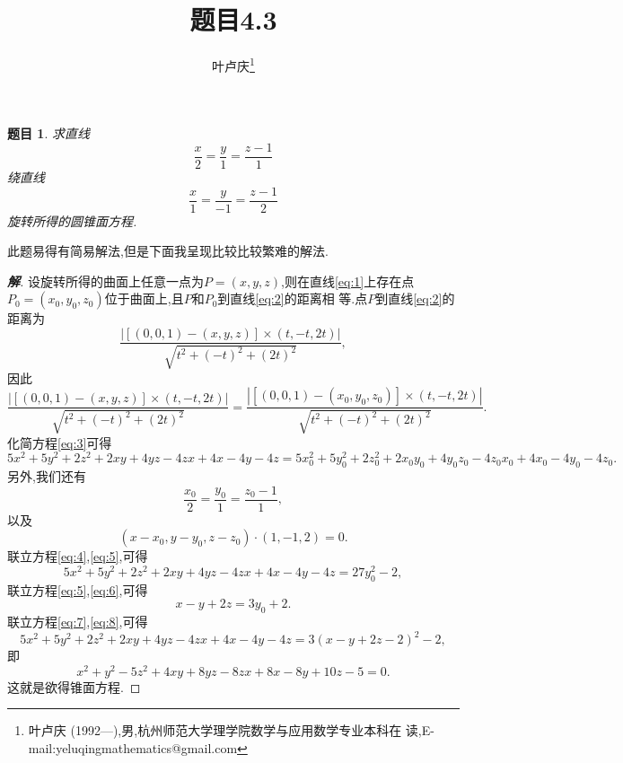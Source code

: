 \documentclass[a4paper]{article}
\newtheorem*{exe}{题目}
\newenvironment{exercise}
{\bigskip\begin{mdframed}\begin{exe}}
    {\end{exe}\end{mdframed}\bigskip}
\begin{document}
\title{\huge{\bf{题目4.3}}} \author{\small{叶卢庆\footnote{叶卢庆
      (1992---),男,杭州师范大学理学院数学与应用数学专业本科在
      读,E-mail:yeluqingmathematics@gmail.com}}}
\maketitle
\begin{exercise}
求直线
\begin{equation}\label{eq:1}
\frac{x}{2}=\frac{y}{1}=\frac{z-1}{1}
\end{equation}
绕直线
\begin{equation}\label{eq:2}
\frac{x}{1}=\frac{y}{-1}=\frac{z-1}{2}
\end{equation}
旋转所得的圆锥面方程.
\end{exercise}
此题易得有简易解法,但是下面我呈现比较比较繁难的解法.
\begin{proof}[\textbf{解}]
设旋转所得的曲面上任意一点为$P=(x,y,z)$,则在直线\eqref{eq:1}上存在点
$P_{0}=(x_0,y_0,z_0)$位于曲面上,且$P$和$P_0$到直线\eqref{eq:2}的距离相
等.点$P$到直线\eqref{eq:2}的距离为
$$
\frac{\left|\left[(0,0,1)-(x,y,z)\right]\times (t,-t,2t)\right|}{\sqrt{t^2+(-t)^2+(2t)^2}},
$$
因此
\begin{equation}
  \label{eq:3}
  \frac{\left|\left[(0,0,1)-(x,y,z)\right]\times (t,-t,2t)\right|}{\sqrt{t^2+(-t)^2+(2t)^2}}=\frac{\left|\left[(0,0,1)-(x_0,y_0,z_0)\right]\times (t,-t,2t)\right|}{\sqrt{t^2+(-t)^2+(2t)^2}}.
\end{equation}
化简方程\eqref{eq:3}可得
\begin{equation}
  \label{eq:4}
5x^{2}+5y^{2}+2z^2+2xy+4yz-4zx+4x-4y-4z=5x_{0}^{2}+5y_{0}^{2}+2z_{0}^2+2x_{0}y_{0}+4y_{0}z_{0}-4z_{0}x_{0}+4x_{0}-4y_{0}-4z_0.
\end{equation}
另外,我们还有
\begin{equation}
  \label{eq:5}
  \frac{x_0}{2}=\frac{y_0}{1}=\frac{z_0-1}{1},
\end{equation}
以及
\begin{equation}
  \label{eq:6}
  (x-x_0,y-y_0,z-z_0)\cdot (1,-1,2)=0.
\end{equation}
联立方程\eqref{eq:4},\eqref{eq:5},可得
\begin{equation}\label{eq:7}
5x^{2}+5y^{2}+2z^2+2xy+4yz-4zx+4x-4y-4z=27y_0^2-2,
\end{equation}
联立方程\eqref{eq:5},\eqref{eq:6},可得
\begin{equation}
  \label{eq:8}
  x-y+2z=3y_0+2.
\end{equation}
联立方程\eqref{eq:7},\eqref{eq:8},可得
\begin{equation}
  \label{eq:9}
  5x^{2}+5y^{2}+2z^2+2xy+4yz-4zx+4x-4y-4z=3(x-y+2z-2)^2-2,
\end{equation}
即
$$
x^2+y^2-5z^2+4xy+8yz-8zx+8x-8y+10z-5=0.
$$
这就是欲得锥面方程.
\end{proof}
\end{document}
